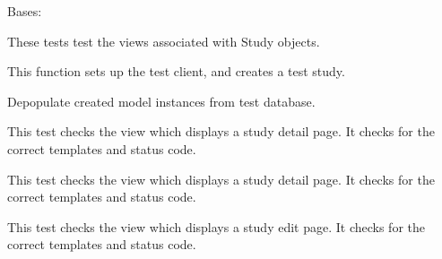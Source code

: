 \documentclass[letterpaper,10pt,english]{sphinxmanual}
\begin{document}
\begin{fulllineitems}
\label{api:mousedb.data.tests.StudyViewTests}
Bases: 

These tests test the views associated with Study objects.

\begin{fulllineitems}
\label{api:mousedb.data.tests.StudyViewTests.setUp}
This function sets up the test client, and creates a test study.

\end{fulllineitems}


\begin{fulllineitems}
\label{api:mousedb.data.tests.StudyViewTests.tearDown}
Depopulate created model instances from test database.

\end{fulllineitems}


\begin{fulllineitems}
\label{api:mousedb.data.tests.StudyViewTests.test_study_delete}
This test checks the view which displays a study detail page.  It checks for the correct templates and status code.

\end{fulllineitems}


\begin{fulllineitems}
\label{api:mousedb.data.tests.StudyViewTests.test_study_detail}
This test checks the view which displays a study detail page.  It checks for the correct templates and status code.

\end{fulllineitems}


\begin{fulllineitems}
\label{api:mousedb.data.tests.StudyViewTests.test_study_edit}
This test checks the view which displays a study edit page.  It checks for the correct templates and status code.


\end{fulllineitems}
\end{fulllineitems}
\end{document}
